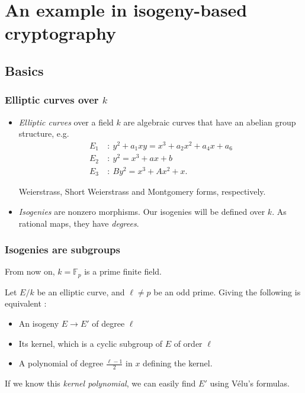 \documentclass[12pt]{beamer}
\newcommand{\F}{\ensuremath{\mathbb{F}}}
\begin{document}
\section{An example in isogeny-based cryptography}


\subsection{Basics}

\begin{frame}
 \frametitle{Elliptic curves over $k$}
 \begin{itemize}
  \item \emph{Elliptic curves} over a field $k$ are algebraic curves that have an abelian group structure, e.g.
  $$\begin{aligned}
  E_1\ &:\ y^2 + a_1 xy  = x^3 + a_2x^2 + a_4x + a_6 \\
  E_2\ &:\ y^2  = x^3 + ax + b \\
  E_3\ &:\ B y^2  = x^3 + Ax^2 + x. 
  \end{aligned}$$
  
  Weierstrass, Short Weierstrass and Montgomery forms, respectively.  
  
  \pause
  
  \item \emph{Isogenies} are nonzero morphisms. Our isogenies will be defined over $k$. As rational maps, they have \emph{degrees}.
 \end{itemize}

 
\end{frame}


\begin{frame}
 \frametitle{Isogenies are subgroups}
 
 \alert{
  From now on, $k = \F_p$ is a prime finite field.
 }
  
 \pause 
 
 
 Let $E/k$ be an elliptic curve, and $\ell\neq p$ be an odd prime. Giving the following is equivalent :
 \begin{itemize}
  \pause
  
  \item An isogeny $E\to E'$ of degree $\ell$
  
  \pause
  
  \item Its kernel, which is a cyclic subgroup of $E$ of order $\ell$
  
  \pause
  
  \item A polynomial of degree $\frac{\ell - 1}{2}$ in $x$ defining the kernel.
 \end{itemize}
 
 \pause
 \vspace{5mm}
 
 If we know this \emph{kernel polynomial}, we can easily find $E'$ using \alert{V\'elu's formulas}.

\end{frame}
\end{document}
